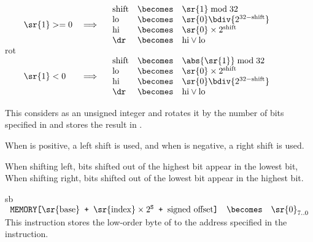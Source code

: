 \begin{instruction}{rot}
     {\rrotropc}
     {
       \begin{math}
         \begin{array}{lcl}
           \sr{1} >= 0 & \implies & \begin{array}{lcl}
             \textrm{shift} & \becomes & \sr{1} \bmod 32 \\
             \textrm{lo} & \becomes & {\sr{0}} \bdiv {2^{32 - \textrm{shift}}} \\
             \textrm{hi} & \becomes & \sr{0} \times 2^{\textrm{shift}} \\
             \dr & \becomes & \textrm{hi}\vee \textrm{lo} \\
           \end{array} \\
           & & \\
           \sr{1} < 0 & \implies & \begin{array}{lcl}
             \textrm{shift} & \becomes & \abs{\sr{1}} \bmod 32 \\
             \textrm{lo} & \becomes & \sr{0} \times 2^{\textrm{shift}} \\
             \textrm{hi} & \becomes & {\sr{0}} \bdiv {2^{32 - \textrm{shift}}} \\
             \dr & \becomes & \textrm{hi}\vee \textrm{lo} \\
           \end{array}
         \end{array}
       \end{math}
     }
     {
       This considers  as an unsigned integer and rotates it by
       the number of bits specified in  and stores the result in
       \dr.

       When  is positive, a left shift is used, and when 
       is negative, a right shift is used.

       When shifting left, bits shifted out of the highest bit appear
       in the lowest bit, When shifting right, bits shifted out of the
       lowest bit appear in the highest bit.
     }
\end{instruction}


\begin{instruction}{sb}
     {\sbopc}
     {
       \begin{math}
         \begin{array}{lcl}
           \texttt{MEMORY[\textrm{\sr{base}} + \(\textrm{\sr{index}}
               \times 2^\texttt{S}\) +  \textrm{signed offset}]}
           & \becomes & {\sr{0}}_{7..0}
         \end{array}
       \end{math}
     }
     {
       This instruction stores the low-order byte
       of  to the address specified in the instruction.
     }
\end{instruction}


